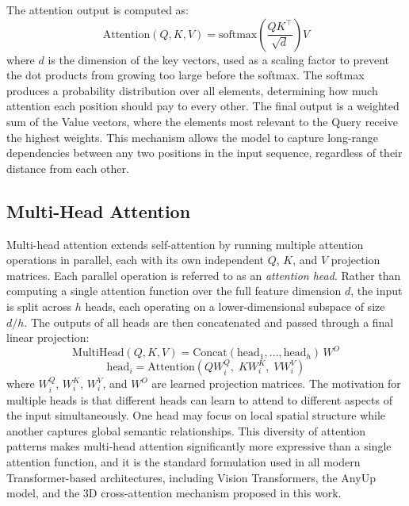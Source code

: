 The attention output is computed as:
\begin{equation}
  \text{Attention}(Q, K, V)
  = \text{softmax}\!\left(\frac{QK^{\top}}{\sqrt{d}}\right) V
  \label{eq:self_attention}
\end{equation}
where $d$ is the dimension of the key vectors, used as a scaling
factor to prevent the dot products from growing too large before
the softmax.
The softmax produces a probability distribution over all
elements, determining how much attention each position should
pay to every other.
The final output is a weighted sum of the Value vectors, where
the elements most relevant to the Query receive the highest
weights.
This mechanism allows the model to capture long-range
dependencies between any two positions in the input sequence,
regardless of their distance from each other.

\subsection{Multi-Head Attention}

Multi-head attention extends self-attention by running multiple
attention operations in parallel, each with its own independent
$Q$, $K$, and $V$ projection matrices.
Each parallel operation is referred to as an \emph{attention
head}.
Rather than computing a single attention function over the full
feature dimension $d$, the input is split across $h$ heads,
each operating on a lower-dimensional subspace of size $d/h$.
The outputs of all heads are then concatenated and passed
through a final linear projection:
\begin{equation}
  \text{MultiHead}(Q, K, V)
  = \text{Concat}(\text{head}_1, \ldots, \text{head}_h)\,W^O
  \label{eq:multihead}
\end{equation}
\begin{equation}
  \text{head}_i
  = \text{Attention}(Q W_i^Q,\; K W_i^K,\; V W_i^V)
\end{equation}
where $W_i^Q$, $W_i^K$, $W_i^V$, and $W^O$ are learned
projection matrices.
The motivation for multiple heads is that different heads can
learn to attend to different aspects of the input
simultaneously.
One head may focus on local spatial structure while another
captures global semantic relationships.
This diversity of attention patterns makes multi-head attention
significantly more expressive than a single attention function,
and it is the standard formulation used in all modern
Transformer-based architectures, including Vision Transformers,
the AnyUp model, and the 3D cross-attention mechanism proposed in
this work.

